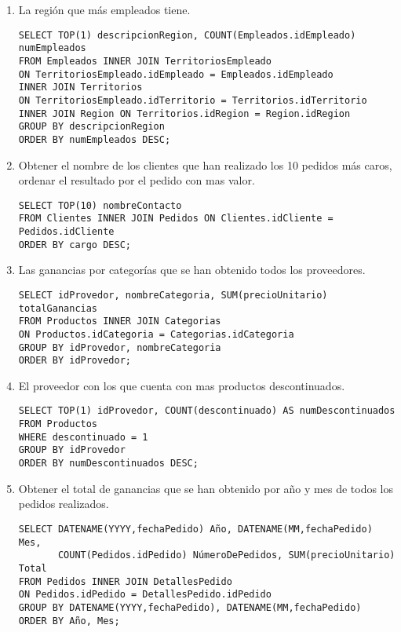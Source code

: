 \documentclass[12pt, letterpaper]{article}
\begin{document}
\begin{enumerate}
        \item La región que más empleados tiene.
        
            \begin{verbatim}
SELECT TOP(1) descripcionRegion, COUNT(Empleados.idEmpleado) numEmpleados
FROM Empleados INNER JOIN TerritoriosEmpleado 
ON TerritoriosEmpleado.idEmpleado = Empleados.idEmpleado
INNER JOIN Territorios 
ON TerritoriosEmpleado.idTerritorio = Territorios.idTerritorio
INNER JOIN Region ON Territorios.idRegion = Region.idRegion
GROUP BY descripcionRegion
ORDER BY numEmpleados DESC;
            \end{verbatim}

        \item Obtener el nombre de los clientes que han realizado los 10 pedidos más caros, ordenar el resultado por el pedido con mas valor.
        
            \begin{verbatim}
SELECT TOP(10) nombreContacto
FROM Clientes INNER JOIN Pedidos ON Clientes.idCliente = Pedidos.idCliente
ORDER BY cargo DESC;
            \end{verbatim}

        \item Las ganancias por categorías que se han obtenido todos los proveedores.
        
            \begin{verbatim}
SELECT idProvedor, nombreCategoria, SUM(precioUnitario) totalGanancias
FROM Productos INNER JOIN Categorias 
ON Productos.idCategoria = Categorias.idCategoria
GROUP BY idProvedor, nombreCategoria
ORDER BY idProvedor;
            \end{verbatim}

        \item El proveedor con los que cuenta con mas productos descontinuados.
        
            \begin{verbatim}
SELECT TOP(1) idProvedor, COUNT(descontinuado) AS numDescontinuados
FROM Productos
WHERE descontinuado = 1
GROUP BY idProvedor
ORDER BY numDescontinuados DESC;
            \end{verbatim}

        \item Obtener el total de ganancias que se han obtenido por año y mes de todos los pedidos realizados.
        
            \begin{verbatim}
SELECT DATENAME(YYYY,fechaPedido) Año, DATENAME(MM,fechaPedido) Mes,
       COUNT(Pedidos.idPedido) NúmeroDePedidos, SUM(precioUnitario) Total
FROM Pedidos INNER JOIN DetallesPedido 
ON Pedidos.idPedido = DetallesPedido.idPedido
GROUP BY DATENAME(YYYY,fechaPedido), DATENAME(MM,fechaPedido)
ORDER BY Año, Mes;
            \end{verbatim}

    \end{enumerate}
\end{document}
